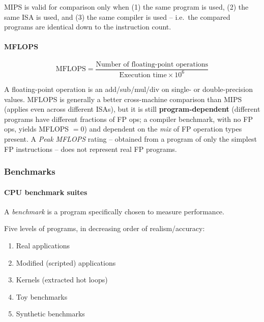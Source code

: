 \begin{note}
MIPS is valid for comparison only when (1) the same program is used, (2) the
same ISA is used, and (3) the same compiler is used -- i.e.\ the compared
programs are identical down to the instruction count.
\end{note}

\paragraph{MFLOPS}
\begin{definition}
\[
  \text{MFLOPS} = \frac{\text{Number of floating-point operations}}
  {\text{Execution time} \times 10^6}
\]
\end{definition}
A floating-point operation is an add/sub/mul/div on single- or
double-precision values. MFLOPS is generally a better cross-machine
comparison than MIPS (applies even across different ISAs), but it is still
\textbf{program-dependent} (different programs have different fractions of
FP ops; a compiler benchmark, with no FP ops, yields MFLOPS $=0$) and
dependent on the \emph{mix} of FP operation types present. A \emph{Peak
MFLOPS} rating -- obtained from a program of only the simplest FP
instructions -- does not represent real FP programs.

\subsubsection{Benchmarks}
\label{sec:benchmarks}

\paragraph{CPU benchmark suites}
\begin{definition}[Benchmark]
A \emph{benchmark} is a program specifically chosen to measure performance.
\end{definition}
Five levels of programs, in decreasing order of realism/accuracy:
\begin{enumerate}
  \item Real applications
  \item Modified (scripted) applications
  \item Kernels (extracted hot loops)
  \item Toy benchmarks
  \item Synthetic benchmarks
\end{enumerate}

